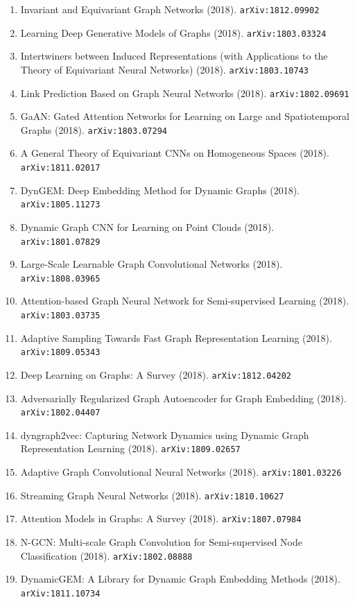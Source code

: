 \documentclass[11pt]{article}
\begin{document}
\begin{enumerate}
  Autoencoders (2018). \texttt{arXiv:1802.03480}
  \item Invariant and Equivariant Graph Networks (2018). \texttt{arXiv:1812.09902}
  \item Learning Deep Generative Models of Graphs (2018). \texttt{arXiv:1803.03324}
  \item Intertwiners between Induced Representations (with Applications to the
  Theory of Equivariant Neural Networks) (2018). \texttt{arXiv:1803.10743}
  \item Link Prediction Based on Graph Neural Networks (2018). \texttt{arXiv:1802.09691}
  \item GaAN: Gated Attention Networks for Learning on Large and Spatiotemporal
  Graphs (2018). \texttt{arXiv:1803.07294}
  \item A General Theory of Equivariant CNNs on Homogeneous Spaces (2018). \texttt{arXiv:1811.02017}
  \item DynGEM: Deep Embedding Method for Dynamic Graphs (2018). \texttt{arXiv:1805.11273}
  \item Dynamic Graph CNN for Learning on Point Clouds (2018). \texttt{arXiv:1801.07829}
  \item Large-Scale Learnable Graph Convolutional Networks (2018). \texttt{arXiv:1808.03965}
  \item Attention-based Graph Neural Network for Semi-supervised Learning (2018). \texttt{arXiv:1803.03735}
  \item Adaptive Sampling Towards Fast Graph Representation Learning (2018). \texttt{arXiv:1809.05343}
  \item Deep Learning on Graphs: A Survey (2018). \texttt{arXiv:1812.04202}
  \item Adversarially Regularized Graph Autoencoder for Graph Embedding (2018). \texttt{arXiv:1802.04407}
  \item dyngraph2vec: Capturing Network Dynamics using Dynamic Graph
  Representation Learning (2018). \texttt{arXiv:1809.02657}
  \item Adaptive Graph Convolutional Neural Networks (2018). \texttt{arXiv:1801.03226}
  \item Streaming Graph Neural Networks (2018). \texttt{arXiv:1810.10627}
  \item Attention Models in Graphs: A Survey (2018). \texttt{arXiv:1807.07984}
  \item N-GCN: Multi-scale Graph Convolution for Semi-supervised Node
  Classification (2018). \texttt{arXiv:1802.08888}
  \item DynamicGEM: A Library for Dynamic Graph Embedding Methods (2018). \texttt{arXiv:1811.10734}

\end{enumerate}
\end{document}

